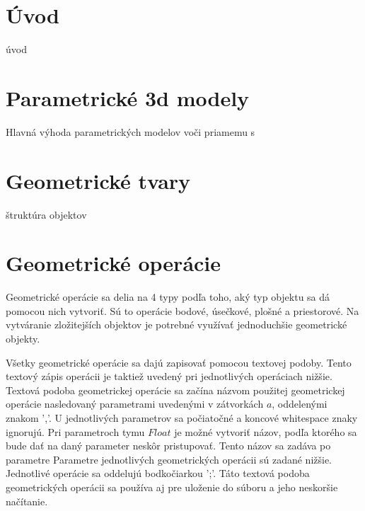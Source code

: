 

\chapter{Úvod}
úvod

\chapter{Parametrické 3d modely}
Hlavná výhoda parametrických modelov voči priamemu  s



\chapter{Geometrické tvary}
\label{chapt:Geometrické_tvary}
štruktúra objektov



\chapter{Geometrické operácie}
Geometrické operácie sa delia na 4 typy podľa toho, aký typ objektu sa dá pomocou nich vytvoriť. Sú to operácie bodové, úsečkové, plošné a priestorové. Na vytváranie zložitejších objektov je potrebné využívať jednoduchšie geometrické objekty. 

Všetky geometrické operácie sa dajú zapisovať pomocou textovej podoby. Tento textový zápis operácii je taktiež uvedený pri jednotlivých operáciach nižšie. 
Textová podoba geometrickej operácie sa začína názvom použitej geometrickej operácie nasledovaný parametrami uvedenými v zátvorkách \( a \), oddelenými znakom ','.  U jednotlivých parametrov sa počiatočné a koncové whitespace znaky ignorujú.
Pri parametroch tymu $Float$ je možné vytvoriť názov, podľa ktorého sa bude dať na daný parameter neskôr pristupovať. 
Tento názov sa zadáva po parametre 
Parametre jednotlivých geometrických operácii sú zadané nižšie. 
Jednotlivé operácie sa oddelujú bodkočiarkou ';'. 
Táto textová podoba geometrických operácii sa používa aj pre uloženie do súboru a jeho neskoršie načítanie. 

